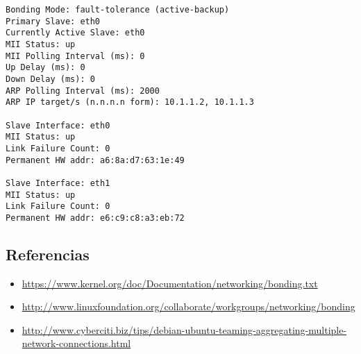 \begin{itemize}
\begin{lstlisting}
Bonding Mode: fault-tolerance (active-backup)
Primary Slave: eth0
Currently Active Slave: eth0
MII Status: up
MII Polling Interval (ms): 0
Up Delay (ms): 0
Down Delay (ms): 0
ARP Polling Interval (ms): 2000
ARP IP target/s (n.n.n.n form): 10.1.1.2, 10.1.1.3

Slave Interface: eth0
MII Status: up
Link Failure Count: 0
Permanent HW addr: a6:8a:d7:63:1e:49

Slave Interface: eth1
MII Status: up
Link Failure Count: 0
Permanent HW addr: e6:c9:c8:a3:eb:72
\end{lstlisting}
\end{itemize}



\subsection{Referencias}
\begin{itemize}
	\item \url{https://www.kernel.org/doc/Documentation/networking/bonding.txt}
	\item \url{http://www.linuxfoundation.org/collaborate/workgroups/networking/bonding}
	\item \url{http://www.cyberciti.biz/tips/debian-ubuntu-teaming-aggregating-multiple-network-connections.html}
\end{itemize}


